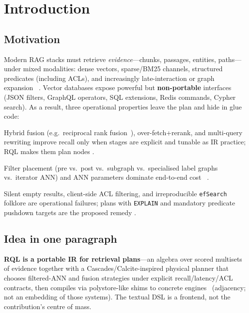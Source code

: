 \section{Introduction}
\label{sec:intro}

\subsection{Motivation}
Modern RAG stacks must retrieve \emph{evidence}---chunks, passages, entities, paths---under mixed modalities: dense vectors, sparse/BM25 channels, structured predicates (including ACLs), and increasingly late-interaction or graph expansion~\citep{lewis2020rag} \established{}.
Vector databases expose powerful but \textbf{non-portable} interfaces (JSON filters, GraphQL operators, SQL extensions, Redis commands, Cypher search).
As a result, three operational properties leave the plan and hide in glue code:

\begin{description}[leftmargin=1.6cm,style=nextline]
  \item[Accuracy.] Hybrid fusion (e.g.\ reciprocal rank fusion~\citep{cormack2009rrf}), over-fetch+rerank, and multi-query rewriting improve recall only when stages are explicit and tunable \established{} as IR practice; RQL makes them plan nodes \hypothesis{}.
  \item[Latency.] Filter placement (pre vs.\ post vs.\ subgraph vs.\ specialised label graphs vs.\ iterator ANN) and ANN parameters dominate end-to-end cost~\citep{patel2024acorn,gollapudi2023filtered,zhang2023vbase,lin2025fanns} \established{}.
  \item[Reliability.] Silent empty results, client-side ACL filtering, and irreproducible \texttt{efSearch} folklore are operational failures; plans with \texttt{EXPLAIN} and mandatory predicate pushdown targets are the proposed remedy \hypothesis{}.
\end{description}

\subsection{Idea in one paragraph}
\textbf{RQL is a portable IR for retrieval plans}---an algebra over scored multisets of evidence together with a Cascades/Calcite-inspired physical planner that chooses filtered-ANN and fusion strategies under explicit recall/latency/ACL contracts, then compiles via polystore-like shims to concrete engines~\citep{begoli2018calcite,substrait,duggan2015bigdawg} \hypothesis{} (adjacency; not an embedding of those systems).
The textual DSL is a frontend, not the contribution's centre of mass.

